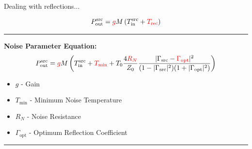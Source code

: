 \documentclass[aspectratio=169]{beamer}
\begin{document}
\begin{frame}{\small{Dealing with reflections...}}

	\begin{minipage}{0.75\textwidth}
		{\tiny
			\begin{equation}
				P_{\text{out}}^{\text{src}} = \textcolor{red}{g} M \left( T_{\text{in}}^{\text{src}} + \textcolor{red}{T_{\text{rec}}} \right)
			\end{equation}
		}
	\end{minipage}

	\vspace{0.1cm}
	\hrule  %
	\vspace{0.1cm}

	\begin{minipage}{0.75\textwidth}
		\textbf{\small{Noise Parameter Equation:}}
		{\tiny
			\begin{equation}
				P_{\text{out}}^{\text{src}} = \textcolor{red}{g} M \left( T_{\text{in}}^{\text{src}} + \textcolor{red}{T_{\text{min}}} + T_0 \frac{4\textcolor{red}{R_N}}{Z_0} \frac{|\Gamma_{\text{src}} - \textcolor{red}{\Gamma_{\text{opt}}}|^2}{(1 - |\Gamma_{\text{src}}|^2)(1 + |\Gamma_{\text{opt}}|^2)} \right)
			\end{equation}
		}
	\end{minipage}
	\quad
	\begin{minipage}{0.2\textwidth}
		\tiny
		\begin{itemize}
			\item \( g \) - Gain
			\item \( T_{\text{min}} \) - Minimum Noise Temperature
			\item \( R_N \) - Noise Resistance
			\item \( \Gamma_{\text{opt}} \) - Optimum Reflection Coefficient
		\end{itemize}
	\end{minipage}

	\vspace{0.05cm}
	\hrule  %
	\vspace{0.05cm}


\end{frame}
\end{document}
